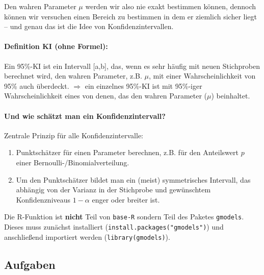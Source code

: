\documentclass[a4paper]{article}
\newcommand\dangersign[1][2ex]{%
  \renewcommand\stacktype{L}%
  \scaleto{\stackon[1.3pt]{\color{red}$\triangle$}{\tiny !}}{#1}%
}
\begin{document}
\noindent Den wahren Parameter $\mu$ werden wir also nie exakt bestimmen können, dennoch können wir versuchen einen Bereich zu bestimmen in dem er ziemlich sicher liegt -- und genau das ist die Idee von Konfidenzintervallen.

\paragraph{Definition KI (ohne Formel):} Ein 95\%-KI ist ein Intervall [a,b], das, wenn es sehr häufig mit neuen Stichproben berechnet wird, den wahren Parameter, z.B. $\mu$, mit einer Wahrscheinlichkeit von 95\% auch überdeckt. $\Rightarrow$ ein einzelnes 95\%-KI ist mit 95\%-iger Wahrscheinlichkeit eines von denen, das den wahren Parameter ($\mu$) beinhaltet.

\paragraph{Und wie schätzt man ein Konfidenzintervall?} Zentrale Prinzip für alle Konfidenzintervalle:

\begin{enumerate}
    \item Punktschätzer für einen Parameter berechnen, z.B. für den Anteilswert $p$ einer Bernoulli-/Binomialverteilung.
    \item Um den Punktschätzer bildet man ein (meist) symmetrisches Intervall, das abhängig von der Varianz in der Stichprobe und gewünschtem Konfidenzniveaus $1-\alpha$ enger oder breiter ist.
\end{enumerate}

\noindent {}

\noindent \dangersign[3ex] Die R-Funktion ist \textbf{nicht} Teil von \texttt{base-R} sondern Teil des Paketes \texttt{gmodels}. Dieses muss zunächst installiert (\texttt{install.packages("gmodels")}) und anschließend importiert werden (\texttt{library(gmodels)}).

\clearpage

\subsection{Aufgaben}
\end{document}
